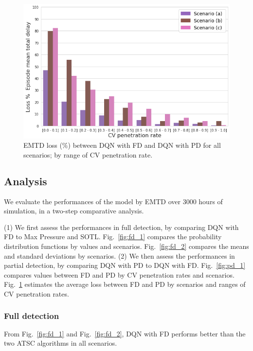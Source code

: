 \documentclass[journal]{IEEEtran}
\begin{document}
\begin{figure}[htbp]
  \begin{center}
    \includegraphics[width=1\linewidth,keepaspectratio]{img/results/pd_2.png}  
    \caption{EMTD loss (\%) between DQN with FD and DQN with PD for all scenarios; by range of CV penetration rate.}
    \label{fig:pd_2}
  \end{center}
\end{figure}

\subsection{Analysis}

We evaluate the performances of the model by EMTD over $3000$ hours of simulation, in a two-step comparative analysis.

(1) We first assess the performances in full detection, by comparing DQN with FD to Max Pressure and SOTL. Fig.~\ref{fig:fd_1} compares the probability distribution functions by values and scenarios. Fig.~\ref{fig:fd_2} compares the means and standard deviations by scenarios. (2) We then assess the performances in partial detection, by comparing DQN with PD to DQN with FD. 
Fig.~\ref{fig:pd_1} compares values between FD and PD by CV penetration rates and scenarios. Fig.~\ref{fig:pd_2} estimates the average loss between FD and PD by scenarios and ranges of CV penetration rates.

\subsubsection{Full detection}
From Fig.~\ref{fig:fd_1} and Fig.~\ref{fig:fd_2}, DQN with FD performs better than the two ATSC algorithms in all scenarios. 
\end{document}
